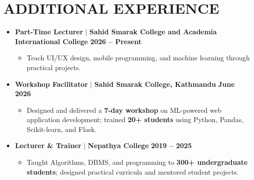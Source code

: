 \documentclass[10pt,a4paper]{article}
\begin{document}
\section{ADDITIONAL EXPERIENCE}
\begin{itemize}[leftmargin=1em, label={}]
    \item \textbf{Part-Time Lecturer} $|$ \textbf{Sahid Smarak College and Academia International College} \hfill \textbf{2026 -- Present}
    \begin{itemize}
        \item Teach UI/UX design, mobile programming, and machine learning through practical projects.
    \end{itemize}

    \vspace{6pt}

    \item \textbf{Workshop Facilitator} $|$ \textbf{Sahid Smarak College, Kathmandu} \hfill \textbf{June 2026}
    \begin{itemize}
        \item Designed and delivered a \textbf{7-day workshop} on ML-powered web application development; trained \textbf{20+ students} using Python, Pandas, Scikit-learn, and Flask.
    \end{itemize}

    \vspace{6pt}

    \item \textbf{Lecturer \& Trainer} $|$ \textbf{Nepathya College} \hfill \textbf{2019 -- 2025}
    \begin{itemize}
        \item Taught Algorithms, DBMS, and programming to \textbf{300+ undergraduate students}; designed practical curricula and mentored student projects.
    \end{itemize}
\end{itemize}
\end{document}
